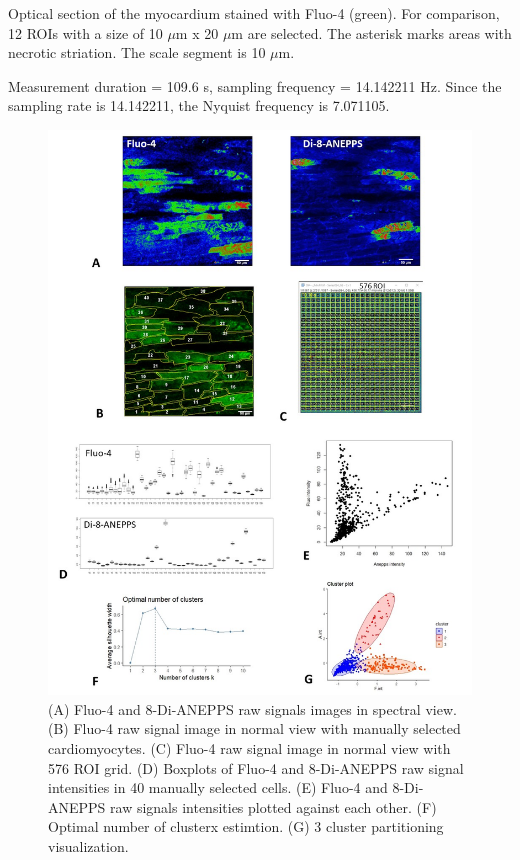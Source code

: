 \documentclass{biophys-new}
\begin{document}
Optical section of the myocardium stained with Fluo-4 (green).
For comparison, 12 ROIs with a size of 10 $\mu$m x 20 $\mu$m are selected.
The asterisk marks areas with necrotic striation. The scale segment is 10 $\mu$m.

Measurement duration = 109.6 s,  sampling frequency = 14.142211 Hz.
Since the sampling rate is 14.142211, the Nyquist frequency is 7.071105.

\begin{figure}
    \includegraphics[width=0.9\linewidth]{fig4.jpg}
    \caption{(A) Fluo-4 and 8-Di-ANEPPS raw signals images in spectral view.  (B) Fluo-4 raw signal image in normal view with manually selected cardiomyocytes. (C) Fluo-4 raw signal image in normal view with 576 ROI grid. (D) Boxplots of Fluo-4 and 8-Di-ANEPPS raw signal intensities in 40 manually selected cells. (E) Fluo-4 and 8-Di-ANEPPS raw signals intensities plotted against each other. (F) Optimal number of clusterx estimtion. (G) 3 cluster partitioning visualization.}
    \label{fig:fig4}
\end{figure}
\end{document}
